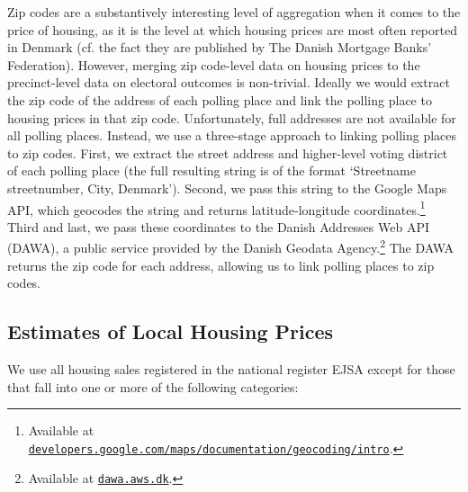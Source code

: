 \documentclass[12pt,a4paper]{article}
\begin{document}
	Zip codes are a substantively interesting level of aggregation when it comes to the price of housing, as it is the level at which housing prices are most often reported in Denmark (cf. the fact they are published by The Danish Mortgage Banks' Federation). However, merging zip code-level data on housing prices to the precinct-level data on electoral outcomes is non-trivial. Ideally we would extract the zip code of the address of each polling place and link the polling place to housing prices in that zip code. Unfortunately, full addresses are not available for all polling places. Instead, we use a three-stage approach to linking polling places to zip codes. First, we extract the street address and higher-level voting district of each polling place (the full resulting string is of the format `Streetname streetnumber, City, Denmark'). Second, we pass this string to the Google Maps API, which geocodes the string and returns latitude-longitude coordinates.\footnote{Available at \texttt{\href{https://developers.google.com/maps/documentation/geocoding/intro}{developers.google.com/maps/documentation/geocoding/intro}}.} Third and last, we pass these coordinates to the Danish Addresses Web API (DAWA), a public service provided by the Danish Geodata Agency.\footnote{Available at \texttt{\href{http://dawa.aws.dk/}{dawa.aws.dk}}.} The DAWA returns the zip code for each address, allowing us to link polling places to zip codes. %
	
	
	\subsection{Estimates of  Local Housing Prices}\label{app_housingselect}
	
	We use all housing sales registered in the national register EJSA except for those that fall into one or more of the following categories:
	
\end{document}
